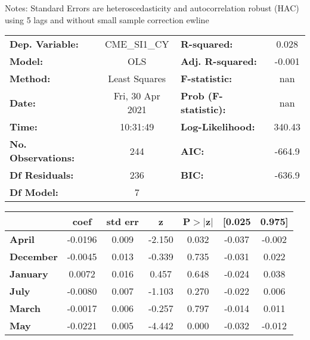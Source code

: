 Notes: \newline
 [1] Standard Errors are heteroscedasticity and autocorrelation robust (HAC) using 5 lags and without small sample correction
ewline\begin{center}
\begin{tabular}{lclc}
\toprule
\textbf{Dep. Variable:}    &   CME\_SI1\_CY   & \textbf{  R-squared:         } &     0.028   \\
\textbf{Model:}            &       OLS        & \textbf{  Adj. R-squared:    } &    -0.001   \\
\textbf{Method:}           &  Least Squares   & \textbf{  F-statistic:       } &       nan   \\
\textbf{Date:}             & Fri, 30 Apr 2021 & \textbf{  Prob (F-statistic):} &      nan    \\
\textbf{Time:}             &     10:31:49     & \textbf{  Log-Likelihood:    } &    340.43   \\
\textbf{No. Observations:} &         244      & \textbf{  AIC:               } &    -664.9   \\
\textbf{Df Residuals:}     &         236      & \textbf{  BIC:               } &    -636.9   \\
\textbf{Df Model:}         &           7      & \textbf{                     } &             \\
\bottomrule
\end{tabular}
\begin{tabular}{lcccccc}
                   & \textbf{coef} & \textbf{std err} & \textbf{z} & \textbf{P$> |$z$|$} & \textbf{[0.025} & \textbf{0.975]}  \\
\midrule
\textbf{April}     &      -0.0196  &        0.009     &    -2.150  &         0.032        &       -0.037    &       -0.002     \\
\textbf{December}  &      -0.0045  &        0.013     &    -0.339  &         0.735        &       -0.031    &        0.022     \\
\textbf{January}   &       0.0072  &        0.016     &     0.457  &         0.648        &       -0.024    &        0.038     \\
\textbf{July}      &      -0.0080  &        0.007     &    -1.103  &         0.270        &       -0.022    &        0.006     \\
\textbf{March}     &      -0.0017  &        0.006     &    -0.257  &         0.797        &       -0.014    &        0.011     \\
\textbf{May}       &      -0.0221  &        0.005     &    -4.442  &         0.000        &       -0.032    &       -0.012     \\

\end{tabular}
\end{center}

